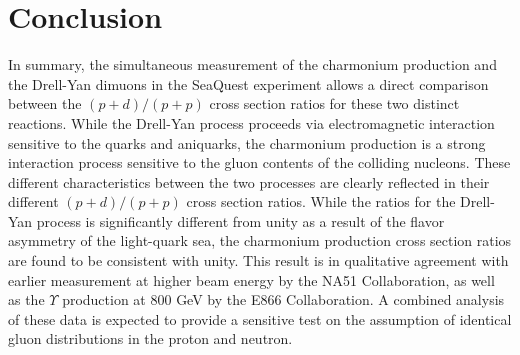 \documentclass[reprint,aps,unsortedaddress,superscriptaddress,prl,floatfix,showpacs,linenumbers]{revtex4-2}
\begin{document}
\section{Conclusion}
In summary, the simultaneous measurement of the charmonium
production and the Drell-Yan
dimuons in the SeaQuest experiment allows a direct comparison between
the $(p+d)/(p+p)$ cross section ratios for these two distinct reactions.
While the Drell-Yan process proceeds via electromagnetic interaction sensitive
to the quarks and aniquarks, the charmonium production is a strong interaction
process sensitive to the gluon contents of the colliding nucleons. These
different characteristics between the two processes are clearly reflected
in their different $(p+d)/(p+p)$ cross section ratios. While the ratios for
the Drell-Yan process is significantly different from unity as a result of
the flavor asymmetry of the light-quark sea, the charmonium production
cross section ratios are found to be consistent with unity. This result
is in qualitative agreement with earlier measurement at higher beam energy
by the NA51 Collaboration, as well as the $\Upsilon$ production at 800 GeV
by the E866 Collaboration. A combined analysis of these data is expected
to provide a sensitive test on the assumption of identical gluon
distributions in the proton and neutron.


\end{document}
